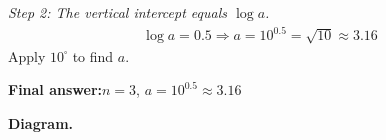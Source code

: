 \documentclass[11pt]{article}
\begin{document}
\textit{Step 2: The vertical intercept equals \( \log a \).}
\[\begin{gathered}
\log a = 0.5 \Rightarrow a = 10^{0.5} = \sqrt{10} \approx 3.16
\end{gathered}\]
Apply \( 10^{\square} \) to find \( a \).

\begin{answerbox}
\textbf{Final answer:}\quad \(\displaystyle  n = 3 \), \(\displaystyle  a = 10^{0.5} \approx 3.16 \)
\end{answerbox}
\textbf{Diagram.}

\begin{center}
\end{center}
\end{document}
